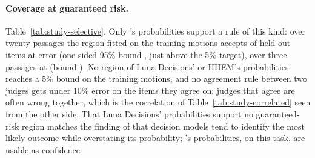 \begin{table}[t]
\centering\small
{}
\caption{Coverage at guaranteed risk: acceptance thresholds fitted on the training motions so that the one-sided Clopper--Pearson 95\% bound on the error among accepted items is at most 5\%, then applied to the held-out motions.}
\label{tab:study-selective}
\end{table}

\paragraph{Coverage at guaranteed risk.} Table~\ref{tab:study-selective}. Only \jev{}'s probabilities support a rule of this kind: over twenty passages the region fitted on the training motions accepts \studySelCoverageJevTwoZero{} of held-out items at \studySelErrorJevTwoZero{} error (one-sided 95\% bound \studySelUpperJevTwoZero{}, just above the 5\% target), over three passages \studySelCoverageJevThree{} at \studySelErrorJevThree{} (bound \studySelUpperJevThree{}). No region of Luna Decisions' or HHEM's probabilities reaches a 5\% bound on the training motions, and no agreement rule between two judges gets under 10\% error on the items they agree on: judges that agree are often wrong together, which is the correlation of Table~\ref{tab:study-correlated} seen from the other side. That Luna Decisions' probabilities support no guaranteed-risk region matches the finding of \citet{duan2026jeval} that decision models tend to identify the most likely outcome while overstating its probability; \jev{}'s probabilities, on this task, are usable as confidence.

\begin{table}[t]
\centering\small
{}
\caption{CHARM-100 (\studyPanelCellsCharmOneZeroZero{} criterion judgements with a human label): agreement of each judge with the human labels under the MET/UNMET reading.}
\label{tab:study-charm}
\end{table}

\begin{table}[t]
\centering\small
{}
\caption{H1: the same pair of judges on \dc{} (top-3, held-out) and on the subjective panels; $\phi$ between error indicators with bootstrap intervals.}
\label{tab:study-h1}
\end{table}

